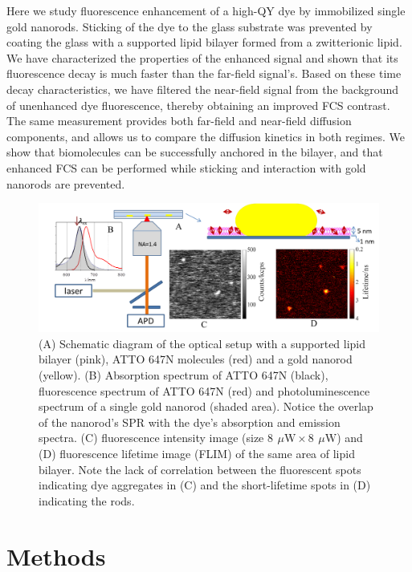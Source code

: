 \documentclass[journal=jpccck,manuscript=article]{achemso}
\newcommand{\uW}{\ensuremath{\,\mu\textrm{W}}}
\begin{document}
Here we study fluorescence enhancement of a high-QY dye by immobilized single gold nanorods. Sticking of the dye to the glass substrate was prevented by coating the glass with a supported lipid bilayer formed from a zwitterionic lipid. We have characterized the properties of the enhanced signal and shown that its fluorescence decay is much faster than the far-field signal’s. Based on these time decay characteristics, we have filtered the near-field signal from the background of unenhanced dye fluorescence, thereby obtaining an improved FCS contrast. The same measurement provides both far-field and near-field diffusion components, and allows us to compare the diffusion kinetics in both regimes. We show that biomolecules can be successfully anchored in the bilayer, and that enhanced FCS can be performed while sticking and interaction with gold nanorods are prevented.\\
\begin{figure}
	\centering
	\includegraphics[width=\textwidth]{schematic.png}
	\caption{(A) Schematic diagram of the optical setup with a supported lipid bilayer (pink), ATTO 647N molecules (red) and a gold nanorod (yellow). (B) Absorption spectrum of ATTO 647N (black), fluorescence spectrum of ATTO 647N (red) and photoluminescence spectrum of a single gold nanorod (shaded area). Notice the overlap of the nanorod's SPR with the dye's absorption and emission spectra. (C) fluorescence intensity image (size $8~\uW \times 8~\uW$) and (D) fluorescence lifetime image (FLIM) of the same area of lipid bilayer. Note the lack of correlation between the fluorescent spots indicating dye aggregates in (C) and the short-lifetime spots in (D) indicating the rods.}
	\label{fig:schematic}
\end{figure}
\section{Methods}
\end{document}
